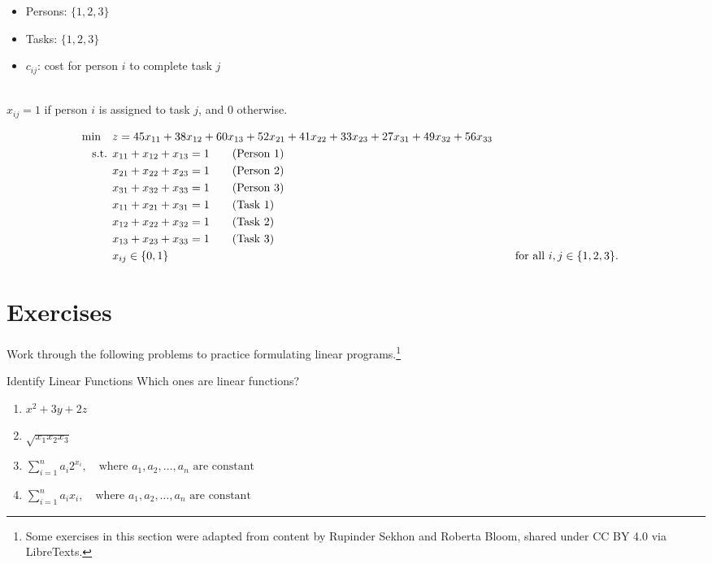 \begin{solution}

\smallskip {}
\begin{itemize}
\item Persons: $\{1, 2, 3\}$
\item Tasks: $\{1, 2, 3\}$
\end{itemize}

\smallskip {}
\begin{itemize}
\item $c_{ij}$: cost for person $i$ to complete task $j$
\end{itemize}

\smallskip {} \\
$x_{ij} = 1$ if person $i$ is assigned to task $j$, and $0$ otherwise.

\smallskip {}
\begin{align*}
\min \quad & z = 45x_{11} + 38x_{12} + 60x_{13} + 52x_{21} + 41x_{22} + 33x_{23} + 27x_{31} + 49x_{32} + 56x_{33} \\
\text{ s.t. }        & x_{11} + x_{12} + x_{13} = 1   \tag{Person 1} \\
& x_{21} + x_{22} + x_{23} = 1   \tag{Person 2} \\
& x_{31} + x_{32} + x_{33} = 1   \tag{Person 3} \\
& x_{11} + x_{21} + x_{31} = 1   \tag{Task 1} \\
& x_{12} + x_{22} + x_{32} = 1   \tag{Task 2} \\
& x_{13} + x_{23} + x_{33} = 1   \tag{Task 3} \\
& x_{ij} \in \{0, 1\} &&\quad \text{for all } i, j \in \{1, 2, 3\}.
\end{align*}
\end{solution}

\section{Exercises}

Work through the following problems to practice formulating linear programs.\footnote{Some exercises in this section were adapted from content by Rupinder Sekhon and Roberta Bloom, shared under CC BY 4.0 via LibreTexts.}


\begin{ex}{Identify Linear Functions}{}
 Which ones are linear functions?
\begin{enumerate}
    \item $x^2 + 3y + 2z$
    \item $\sqrt{x_1 x_2 x_3}$
    \item $\sum_{i=1}^n a_i 2^{x_i}, \quad \text{where } a_1, a_2, \dots, a_n \text{ are constant}$
    \item $\sum_{i=1}^n a_i x_i, \quad \text{where } a_1, a_2, \dots, a_n \text{ are constant}$
\end{enumerate}
\end{ex}

